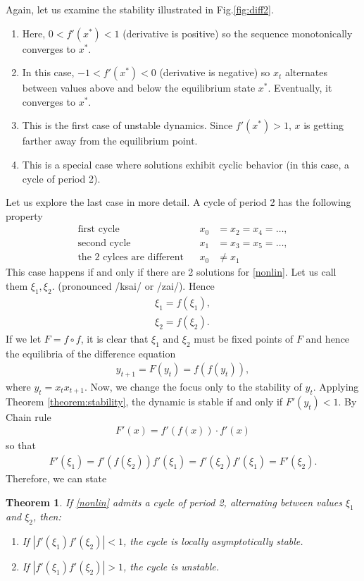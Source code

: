 \documentclass[11pt,a4paper]{book}
\newtheorem{theorem}{Theorem}[section]
\theoremstyle{definition}\newtheorem{definition}{Definition}
\theoremstyle{definition}\newtheorem{fact}{Fact}
\theoremstyle{definition}\newtheorem{remark}{Remark}
\theoremstyle{definition}\newtheorem{ex}{Ex.}
\theoremstyle{definition}\newtheorem{project}{Project}
\theoremstyle{definition}\newtheorem{problem}{Problem}
\theoremstyle{definition}\newtheorem{example}{Example}
\numberwithin{theorem}{section}
\numberwithin{corollary}{chapter}
\numberwithin{assumption}{chapter}
\numberwithin{definition}{chapter}
\numberwithin{prop}{chapter}
\numberwithin{notation}{chapter}
\numberwithin{problem}{chapter}
\numberwithin{example}{chapter}
\numberwithin{fact}{chapter}
\numberwithin{ex}{chapter}
\begin{document}
	Again, let us examine the stability illustrated in Fig.\ref{fig:diff2}. 
	\begin{enumerate}
		\item Here, $0< f'(x^*) < 1$ (derivative is positive) so the sequence monotonically converges to $x^*$.
		\item In this case, $-1 < f'(x^*) < 0$ (derivative is negative) so $x_t$ alternates between values above and below the equilibrium state $x^*$. Eventually, it converges to $x^*$.
		\item This is the first case of unstable dynamics. Since $f'(x^*) > 1$, $x$ is getting farther away from the equilibrium point.
		\item This is a special case where solutions exhibit cyclic behavior (in this case, a cycle of period 2).
	\end{enumerate}
	Let us explore the last case in more detail. A cycle of period 2 has the following property
	\begin{align*}
			\text{first cycle} && x_0 &= x_2 = x_4 = \dots, \\
			\text{second cycle} &&x_1 &= x_3 = x_5 = \dots, \\
			\text{the 2 cylces are different} && x_0 &\neq x_1
	\end{align*}
	This case happens if and only if there are 2 solutions for  \eqref{nonlin}. Let us call them $\xi_1, \xi_2$. (pronounced /ksai/ or /zai/). Hence
	\begin{align*}
		\xi_1 = f(\xi_1), \\
		\xi_2 = f(\xi_2). 
	\end{align*}
	If we let $F = f \circ f$, it is clear that $\xi_1$ and $\xi_2$ must be fixed points of $F$ and hence the equilibria of the difference equation
	\begin{align*}
		y_{t+1} = F(y_t) = f(f(y_t)),
	\end{align*}
	where $y_t = x_t x_{t+1}$. Now, we change the focus only to the stability of $y_t$. Applying Theorem \ref{theorem:stability}, the dynamic is stable if and only if $F'(y_t) < 1$. By Chain rule
	\begin{align*}
		F'(x) = f' ( f(x) ) \cdot f'(x)
	\end{align*}
	so that
	\begin{align*}
		F'(\xi_1) = f' ( f(\xi_2) ) f'(\xi_1) = f'(\xi_2) f'(\xi_1)  = F'(\xi_2).
	\end{align*}
	Therefore, we can state 
	\begin{theorem}
		If \eqref{nonlin} admits a cycle of period 2, alternating between values $\xi_1$ and $\xi_2$, then:
		\begin{enumerate}
			\item If $| f'(\xi_1) f'(\xi_2) | < 1$, the cycle is locally asymptotically stable.
			\item If $| f'(\xi_1) f'(\xi_2) | > 1$, the cycle is unstable.
		\end{enumerate}
	\end{theorem}
	
\end{document}

